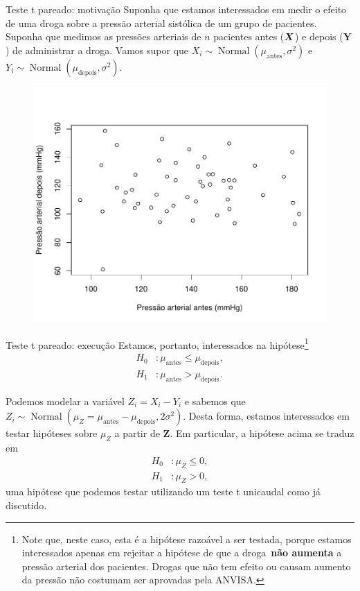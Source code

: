 \begin{frame}{Teste t pareado: motivação}
Suponha que estamos interessados em medir o efeito de uma droga sobre a pressão arterial sistólica de um grupo de pacientes.
Suponha que medimos as pressões arteriais de $n$ pacientes antes ($\boldsymbol{X}$) e depois ($\boldsymbol{Y}$) de administrar a droga.
Vamos supor que $X_i \sim\operatorname{Normal}(\mu_{\text{antes}}, \sigma^2)$ e $Y_i \sim\operatorname{Normal}(\mu_{\text{depois}}, \sigma^2)$.
\begin{figure}
 \begin{center}
  \includegraphics[scale=.5]{figures/blood_pressure.pdf}
 \end{center}
\end{figure}
\end{frame}

\begin{frame}{Teste t pareado: execução}
Estamos, portanto, interessados na hipótese\footnote{Note que, neste caso, esta é a hipótese razoável a ser testada, porque estamos interessados apenas em rejeitar a hipótese de que a droga~\textbf{não aumenta} a pressão arterial dos pacientes.
Drogas que não tem efeito ou causam aumento da pressão não costumam ser aprovadas pela ANVISA.}
\begin{align*}
   H_0 &: \mu_{\text{antes}} \leq \mu_{\text{depois}}, \\
   H_1 &:  \mu_{\text{antes}} > \mu_{\text{depois}}.
  \end{align*}

Podemos modelar a variável $Z_i = X_i-Y_i$ e sabemos que $Z_i \sim\operatorname{Normal}(\mu_Z = \mu_{\text{antes}}-\mu_{\text{depois}}, 2\sigma^2)$.
Desta forma, estamos interessados em testar hipóteses sobre $\mu_Z$ a partir de $\boldsymbol{Z}$.
Em particular, a hipótese acima se traduz em
\begin{align*}
   H_0 &: \mu_Z \leq 0, \\
   H_1 &: \mu_Z > 0,
\end{align*}
uma hipótese que podemos testar utilizando um teste t unicaudal como já discutido.
\end{frame}

